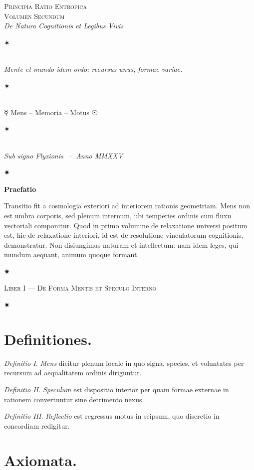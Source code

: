 \documentclass[12pt]{article}
\newcommand{\florale}{\centerline{\large ✷}}
\newcommand{\aster}{\centerline{✶}}
\newcommand{\divider}{\vspace{1em}\florale\vspace{1em}}
\newcommand{\Liber}[1]{\vspace{1ex}\begin{center}\Large\textsc{Liber #1}\end{center}\vspace{-0.5ex}\florale\vspace{0.5ex}}
\begin{document}
\begin{center}
{\Large \textsc{Principia Ratio Entropica}}\\[-0.25ex]
{\small \textsc{Volumen Secundum}}\\[0.5ex]
{\itshape De Natura Cognitionis et Legibus Vivis}\\[1.25em]
\aster\\[0.5em]
{\itshape Mente et mundo idem ordo; recursus unus, formae variae.}\\[0.5em]
\aster\\[0.75em]
{\large ☿\; Mens \;--\; Memoria \;--\; Motus \;☉}\\[0.75em]
\aster\\[0.25em]
{\itshape Sub signo Flyxionis \,·\, Anno MMXXV}
\end{center}

\divider

\begin{center}\textbf{Praefatio}\end{center}

Transitio fit a cosmologia exteriori ad interiorem rationis geometriam. Mens non est umbra corporis, sed plenum internum, ubi temperies ordinis cum fluxu vectoriali componitur. Quod in primo volumine de relaxatione universi positum est, hic de relaxatione interiori, id est de resolutione vinculatorum cognitionis, demonstratur. Non disiungimus naturam et intellectum: nam idem leges, qui mundum aequant, animum quoque formant.

\divider

\Liber{I — De Forma Mentis et Speculo Interno}

\section*{Definitiones.}

\textit{Definitio I.} \; \textit{Mens} dicitur plenum locale in quo signa, species, et voluntates per recursum ad aequalitatem ordinis diriguntur.

\textit{Definitio II.} \; \textit{Speculum} est dispositio interior per quam formae externae in rationem convertuntur sine detrimento nexus.

\textit{Definitio III.} \; \textit{Reflectio} est regressus motus in seipsum, quo discretio in concordiam redigitur.

\section*{Axiomata.}
\end{document}
